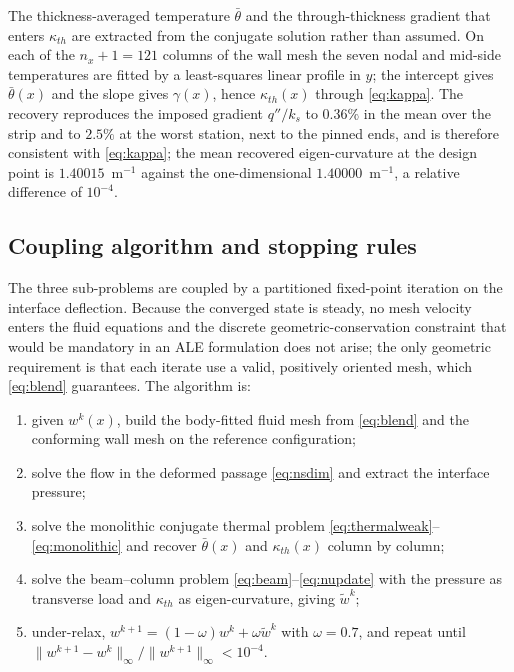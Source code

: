 \documentclass[11pt,a4paper]{article}
\begin{document}
The thickness-averaged temperature $\bar\theta$ and the through-thickness
gradient that enters $\kappa_{th}$ are extracted from the conjugate solution
rather than assumed. On each of the $n_x+1=121$ columns of the wall mesh the
seven nodal and mid-side temperatures are fitted by a least-squares linear
profile in $y$; the intercept gives $\bar\theta(x)$ and the slope gives
$\gamma(x)$, hence $\kappa_{th}(x)$ through \eqref{eq:kappa}. The recovery
reproduces the imposed gradient $q''/k_s$ to $0.36\%$ in the mean over the
strip and to $2.5\%$ at the worst station, next to the pinned ends, and is
therefore consistent with \eqref{eq:kappa}; the mean recovered
eigen-curvature at the design point is $1.40015$~m$^{-1}$ against the
one-dimensional $1.40000$~m$^{-1}$, a relative difference of $10^{-4}$.

\subsection{Coupling algorithm and stopping rules}
\label{sec:coupling}

The three sub-problems are coupled by a partitioned fixed-point iteration on
the interface deflection. Because the converged state is steady, no mesh
velocity enters the fluid equations and the discrete geometric-conservation
constraint that would be mandatory in an ALE formulation
\citep{lesoinne1996geometric} does not arise; the only geometric requirement
is that each iterate use a valid, positively oriented mesh, which
\eqref{eq:blend} guarantees. The algorithm is:

\begin{enumerate}
\item given $w^k(x)$, build the body-fitted fluid mesh from \eqref{eq:blend}
and the conforming wall mesh on the reference configuration;
\item solve the flow in the deformed passage \eqref{eq:nsdim} and extract the
interface pressure;
\item solve the monolithic conjugate thermal problem
\eqref{eq:thermalweak}--\eqref{eq:monolithic} and recover $\bar\theta(x)$ and
$\kappa_{th}(x)$ column by column;
\item solve the beam--column problem \eqref{eq:beam}--\eqref{eq:nupdate} with
the pressure as transverse load and $\kappa_{th}$ as eigen-curvature, giving
$\tilde w^k$;
\item under-relax, $w^{k+1}=(1-\omega)w^k+\omega\tilde w^k$ with $\omega=0.7$,
and repeat until $\|w^{k+1}-w^k\|_\infty/\|w^{k+1}\|_\infty<10^{-4}$.
\end{enumerate}
\end{document}

